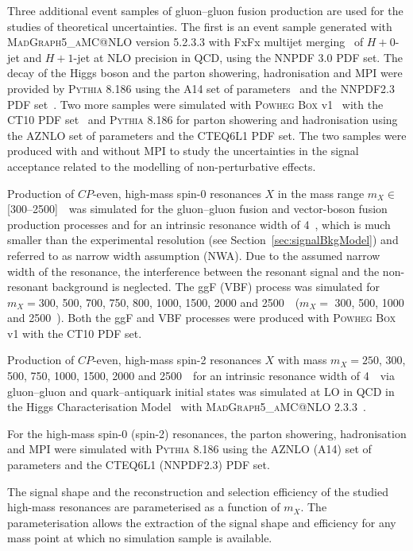 Three additional event samples of gluon--gluon fusion production are used for the studies of theoretical 
uncertainties. 
The first is an event sample generated with \textsc{MadGraph5\_aMC@NLO} version 5.2.3.3 with 
FxFx multijet merging~\cite{Alwall:2014hca,Frederix:2012ps} of
$H + 0$-jet and $H + 1$-jet at NLO precision in QCD, using the NNPDF 3.0 PDF set. 
The decay of the Higgs boson and the 
parton showering, hadronisation and MPI were provided by 
\textsc{Pythia 8.186} using the A14 set of parameters~\cite{ATLASA14} and the 
NNPDF2.3 PDF set~\cite{Ball:2012cx}. 
Two more samples were simulated with
\textsc{Powheg Box} v1~\cite{Nason:2004rx, Frixione:2007vw, Alioli:2010xd, Bagnaschi:2011tu}
 with the CT10 PDF set~\cite{ct10} and 
\textsc{Pythia 8.186} for parton showering and hadronisation using the AZNLO set of parameters and the
CTEQ6L1 PDF set. The two samples were produced with and
 without MPI to study the uncertainties in the signal acceptance related to the
modelling of non-perturbative effects.

Production of $CP$-even, high-mass spin-0 resonances $X$ in the mass range $m_X \in $ [300--2500]~\GeV\ 
was simulated for 
the gluon--gluon fusion and vector-boson fusion production processes and for an 
intrinsic resonance width of 4~\MeV,
which is much smaller than the experimental resolution (see Section~\ref{sec:signalBkgModel})
and referred to as narrow width assumption (NWA). 
Due to the assumed narrow width of
the resonance, the interference between the resonant signal and the non-resonant background
is neglected.
The ggF (VBF) process was simulated for $m_X = 300$, 500, 700, 750, 800, 1000, 1500, 2000 and 2500~\GeV\ 
($m_X =$ 300, 500, 1000 and 2500~\GeV). Both the ggF and VBF processes were 
produced with \textsc{Powheg Box} v1 with the CT10 PDF set.

Production of $CP$-even, high-mass spin-2 resonances $X$ with mass 
$m_X = 250$, 300, 500, 750, 1000, 1500, 2000
and 2500~\GeV\ for an intrinsic resonance width of 4~\MeV\ via gluon--gluon and
quark--antiquark initial states was simulated at LO in QCD in the Higgs Characterisation 
Model~\cite{Artoisenet:2013puc} 
with \textsc{MadGraph5\_aMC@NLO} 2.3.3~\cite{Alwall:2014hca}. 

For the high-mass spin-0 (spin-2) resonances, the parton showering,
hadronisation and MPI were simulated with \textsc{Pythia 8.186} using the AZNLO 
(A14) set of 
parameters and the CTEQ6L1 (NNPDF2.3) PDF set.

The signal shape and the reconstruction and selection efficiency of the studied high-mass
resonances are parameterised as a function of $m_X$. The parameterisation allows
the extraction of the signal shape and efficiency for any mass point at which no simulation sample is available.


